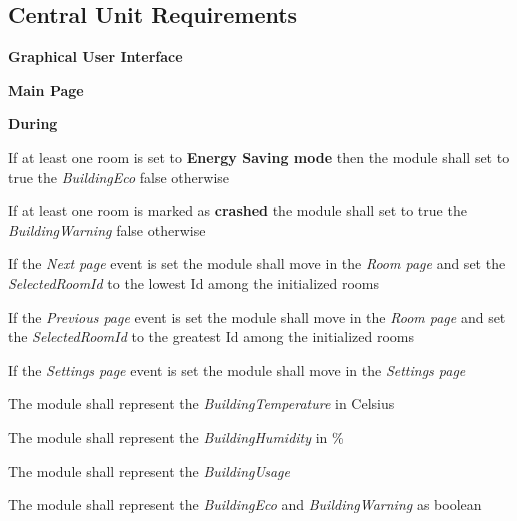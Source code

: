 	\subsection{Central Unit Requirements}
		\begin{req_enum}
			\item \textbf{Graphical User Interface}
			\begin{req_enum}[label*=\arabic*.]
					\item \textbf{Main Page}
						\begin{req_enum}[label*=\arabic*.]
							\item \textbf{During}
								\begin{req_enum}[label*=\arabic*.]			
									\item If at least one room is set to \textbf{Energy Saving mode} then the module shall set to true the \textit{BuildingEco} false otherwise \\
									\item If at least one room is marked as \textbf{crashed} the module shall set to true the \textit{BuildingWarning} false otherwise \\
	
									\item If the \textit{Next page} event is set the module shall move in the \textit{Room page} and set the \textit{SelectedRoomId} to the lowest Id among the initialized rooms \\
									\item If the \textit{Previous page} event is set the module shall move in the \textit{Room page} and set the \textit{SelectedRoomId} to the greatest Id among the initialized rooms \\
									\item If the \textit{Settings page} event is set the module shall move in the \textit{Settings page} \\

									\item The module shall represent the \textit{BuildingTemperature} in Celsius\degree \\
									\item The module shall represent the \textit{BuildingHumidity} in \% \\
									\item The module shall represent the \textit{BuildingUsage} \\
									\item The module shall represent the \textit{BuildingEco} and \textit{BuildingWarning} as boolean \\
								\end{req_enum}
						\end{req_enum}


\end{req_enum}
\end{req_enum}
